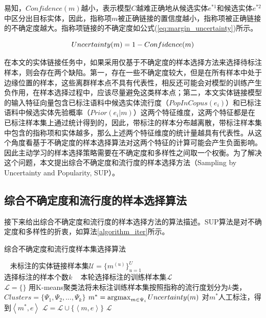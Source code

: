 易知，$Confidence(m)$越小，表示模型$C$越难正确地从候选实体$e^{*1}$和候选实体$e^{*2}$中区分出目标实体，因此，指称项$m$被正确链接的置信度越小，指称项被正确链接的不确定度越大。指称项链接的不确定度如公式(\ref{eq:margin_uncertainty})所示。

\begin{equation}\label{eq:margin_uncertainty}
Uncertainty(m)=1-Confidence(m)\\
\end{equation}

在本文的实体链接任务中，如果采用仅基于不确定度的样本选择方法来选择待标注样本，则会存在两个缺陷。第一，存在一些不确定度较大，但是在所有样本中处于边缘位置的样本，这些离群样本点不具有代表性，相反还可能会对模型的训练产生负作用，在样本选择过程中，应该尽量避免这类样本点；第二，本文实体链接模型的输入特征向量包含已标注语料中候选实体流行度（$PopInCopus(e_i)$）和已标注语料中候选实体先验概率（$Prior(e_i|m)$）这两个特征维度，这两个特征都是在已标注样本集上通过统计得到的，因此，带标注的样本分布越离散，带标注样本集中包含的指称项和实体越多，那么上述两个特征维度的统计量越具有代表性。从这个角度看基于不确定度的样本选择算法对这两个特征的计算可能会产生负面影响。因此主动学习的样本选择策略需要在不确定度和多样性之间取一个权衡。为了解决这个问题，本文提出综合不确定度和流行度的样本选择方法（Sampling by Uncertainty and Popularity, SUP）。

\subsection{综合不确定度和流行度的样本选择算法}
接下来给出综合不确定度和流行度的样本选择方法的算法描述。SUP算法是对不确定度和多样性的折衷，如算法\ref{algorithm_iter}所示。

\begin{algorithm}[htb]
	\caption{综合不确定度和流行度样本集选择算法}
	\label{algorithm_iter}
	\begin{algorithmic}[1] %
		\REQUIRE ~ %
		未标注的实体链接样本集$ \mathcal{U}=\{m^{(u)} \}_{u=1}^U $\\
		\quad \quad 选择标注的样本个数$k$
		\ENSURE ~ %
		本轮选择标注的训练样本集$ \mathcal{L} $\\
		\STATE $ \mathcal{L} = \{\} $
		\STATE 用K-means聚类法将未标注训练样本集按照指称的流行度划分为$k$类，$Clusters=\{\Psi_1,\Psi_2,...,\Psi_k\}$\label{al_iter_line2}
		\STATE $m^{*}=\operatorname*{argmax}_{m \in \Psi_i} Uncertainty(m)$\label{al_iter_line4}
		\STATE 对$m^{*}$人工标注，得到$\left\langle m^{*},e\right\rangle$
		\STATE $\mathcal{L}=\mathcal{L} \cup \{\left\langle m,e\right\rangle\}$
		\ENDFOR
		\RETURN $ \mathcal{L} $
	\end{algorithmic}
\end{algorithm}

